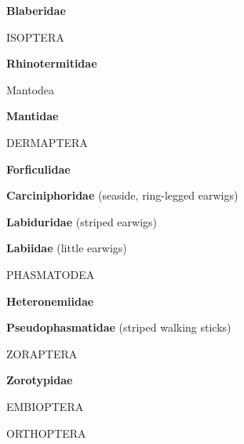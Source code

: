 \documentclass[letterpaper,10pt]{article}
\begin{document}
{\makebox[0.6cm]{}  \textbf{Blaberidae} \par
%
%
%
\makebox[0.0cm]{}  ISOPTERA \par
\makebox[0.6cm]{}  \textbf{Rhinotermitidae} \par
%
%
%
\makebox[0.0cm]{}  Mantodea \par
\makebox[0.6cm]{}  \textbf{Mantidae} \par
%
%
%
\makebox[0.0cm]{}  DERMAPTERA \par
\makebox[0.6cm]{}  \textbf{Forficulidae} \par
\makebox[0.6cm]{}  \textbf{Carciniphoridae} (seaside, ring-legged earwigs) \par
\makebox[0.6cm]{}  \textbf{Labiduridae} (striped earwigs) \par
\makebox[0.6cm]{}  \textbf{Labiidae} (little earwigs) \par
%
%
%
\makebox[0.0cm]{}  PHASMATODEA \par
\makebox[0.6cm]{}  \textbf{Heteronemiidae} \par
\makebox[0.6cm]{}  \textbf{Pseudophasmatidae} (striped walking sticks) \par
%
%
%
\makebox[0.0cm]{}  ZORAPTERA \par
\makebox[0.6cm]{}  \textbf{Zorotypidae} \par
%
%
%
\makebox[0.0cm]{}  EMBIOPTERA  \par
%
%
%
\makebox[0.0cm]{}  ORTHOPTERA \par

}
\end{document}
